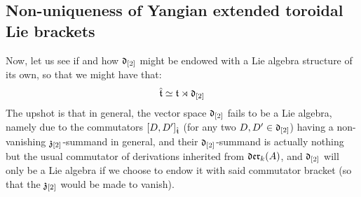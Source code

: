     \subsection{Non-uniqueness of Yangian extended toroidal Lie brackets}
        Now, let us see if and how $\mathfrak{d}_{[2]}$ might be endowed with a Lie algebra structure of its own, so that we might have that:
            $$\hat{\mathfrak{t}} \simeq \mathfrak{t} \rtimes \mathfrak{d}_{[2]}$$
        The upshot is that in general, the vector space $\mathfrak{d}_{[2]}$ fails to be a Lie algebra, namely due to the commutators $[D, D']_{\hat{\mathfrak{t}}}$ (for any two $D, D' \in \mathfrak{d}_{[2]}$) having a non-vanishing $\mathfrak{z}_{[2]}$-summand in general, and their $\mathfrak{d}_{[2]}$-summand is actually nothing but the usual commutator of derivations inherited from $\mathfrak{der}_{k}(A)$, and $\mathfrak{d}_{[2]}$ will only be a Lie algebra if we choose to endow it with said commutator bracket (so that the $\mathfrak{z}_{[2]}$ would be made to vanish). 
        
